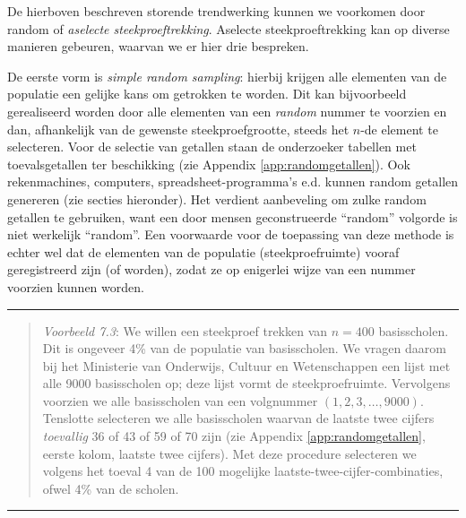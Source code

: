 \documentclass[
]{book}
\begin{document}
De hierboven beschreven storende trendwerking kunnen we voorkomen door
random of \emph{aselecte steekproeftrekking}. Aselecte steekproeftrekking kan
op diverse manieren gebeuren, waarvan we er hier drie bespreken.

De eerste vorm is \emph{simple random sampling}: hierbij krijgen alle
elementen van de populatie een gelijke kans om getrokken te worden. Dit
kan bijvoorbeeld gerealiseerd worden door alle elementen van een
\emph{random} nummer te voorzien en dan, afhankelijk van de gewenste
steekproefgrootte, steeds het \(n\)-de element te selecteren. Voor de
selectie van getallen staan de onderzoeker tabellen met toevalsgetallen
ter beschikking (zie Appendix \ref{app:randomgetallen}).
Ook rekenmachines, computers,
spreadsheet-programma's e.d. kunnen random getallen genereren (zie secties hieronder).
Het verdient aanbeveling om zulke random getallen te gebruiken, want een
door mensen geconstrueerde ``random'' volgorde is niet werkelijk
``random''. Een voorwaarde voor de toepassing van deze methode is echter
wel dat de elementen van de populatie (steekproefruimte) vooraf
geregistreerd zijn (of worden), zodat ze op enigerlei wijze van een
nummer voorzien kunnen worden.

\begin{center}\rule{0.5\linewidth}{0.5pt}\end{center}

\begin{quote}
\emph{Voorbeeld 7.3}: We willen een steekproef trekken
van \(n=400\) basisscholen. Dit is ongeveer 4\% van de populatie van
basisscholen. We vragen daarom bij het Ministerie van Onderwijs, Cultuur
en Wetenschappen een lijst met alle 9000 basisscholen op; deze lijst
vormt de steekproefruimte. Vervolgens voorzien we alle basisscholen van
een volgnummer \((1, 2, 3, \ldots, 9000)\). Tenslotte selecteren we alle
basisscholen waarvan de laatste twee cijfers \emph{toevallig} 36 of 43 of 59
of 70 zijn (zie Appendix \ref{app:randomgetallen}, eerste kolom, laatste twee cijfers).
Met deze procedure selecteren we volgens het toeval 4 van de 100
mogelijke laatste-twee-cijfer-combinaties, ofwel 4\% van de scholen.
\end{quote}

\begin{center}\rule{0.5\linewidth}{0.5pt}\end{center}
\end{document}
